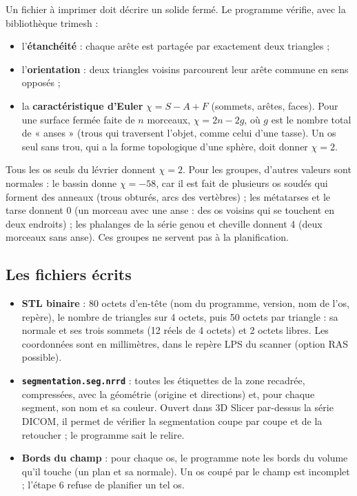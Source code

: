 \documentclass[11pt,a4paper]{article}
\newcommand{\fichier}[1]{\texttt{\small #1}}
\begin{document}
Un fichier à imprimer doit décrire un solide fermé. Le programme vérifie, avec la bibliothèque trimesh :
\begin{itemize}
  \item l'\textbf{étanchéité} : chaque arête est partagée par exactement deux triangles ;
  \item l'\textbf{orientation} : deux triangles voisins parcourent leur arête commune en sens opposés ;
  \item la \textbf{caractéristique d'Euler} $\chi = S - A + F$ (sommets, arêtes, faces). Pour une surface fermée faite
  de $n$ morceaux, $\chi = 2n - 2g$, où $g$ est le nombre total de « anses » (trous qui traversent l'objet, comme
  celui d'une tasse). Un os seul sans trou, qui a la forme topologique d'une sphère, doit donner $\chi = 2$.
\end{itemize}

Tous les os seuls du lévrier donnent $\chi = 2$. Pour les groupes, d'autres valeurs sont normales : le bassin donne
$\chi = -58$, car il est fait de plusieurs os soudés qui forment des anneaux (trous obturés, arcs des vertèbres) ; les
métatarses et le tarse donnent 0 (un morceau avec une anse : des os voisins qui se touchent en deux endroits) ; les
phalanges de la série genou et cheville donnent 4 (deux morceaux sans anse). Ces groupes ne servent pas à la
planification.

\subsection{Les fichiers écrits}

\begin{itemize}
  \item \textbf{STL binaire} : 80 octets d'en-tête (nom du programme, version, nom de l'os, repère), le nombre de
  triangles sur 4 octets, puis 50 octets par triangle : sa normale et ses trois sommets (12 réels de 4 octets) et 2
  octets libres. Les coordonnées sont en millimètres, dans le repère LPS du scanner (option RAS possible).
  \item \textbf{\fichier{segmentation.seg.nrrd}} : toutes les étiquettes de la zone recadrée, compressées, avec la
  géométrie (origine et directions) et, pour chaque segment, son nom et sa couleur. Ouvert dans 3D Slicer par-dessus la
  série DICOM, il permet de vérifier la segmentation coupe par coupe et de la retoucher ; le programme sait le relire.
  \item \textbf{Bords du champ} : pour chaque os, le programme note les bords du volume qu'il touche (un plan et sa
  normale). Un os coupé par le champ est incomplet ; l'étape 6 refuse de planifier un tel os.
\end{itemize}
\end{document}
